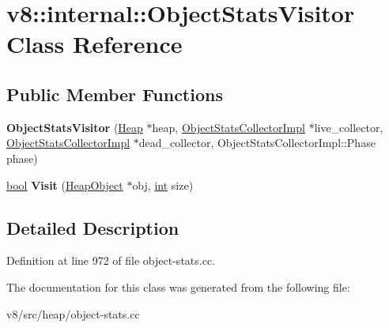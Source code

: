 \hypertarget{classv8_1_1internal_1_1ObjectStatsVisitor}{}\section{v8\+:\+:internal\+:\+:Object\+Stats\+Visitor Class Reference}
\label{classv8_1_1internal_1_1ObjectStatsVisitor}
\subsection*{Public Member Functions}
\begin{DoxyCompactItemize}
\item 
\mbox{\label{classv8_1_1internal_1_1ObjectStatsVisitor_a29e986cc7ed222c05d7e9b505ae61eb5}} 
{\bfseries Object\+Stats\+Visitor} (\mbox{\hyperlink{classv8_1_1internal_1_1Heap}{Heap}} $\ast$heap, \mbox{\hyperlink{classv8_1_1internal_1_1ObjectStatsCollectorImpl}{Object\+Stats\+Collector\+Impl}} $\ast$live\+\_\+collector, \mbox{\hyperlink{classv8_1_1internal_1_1ObjectStatsCollectorImpl}{Object\+Stats\+Collector\+Impl}} $\ast$dead\+\_\+collector, Object\+Stats\+Collector\+Impl\+::\+Phase phase)
\item 
\mbox{\label{classv8_1_1internal_1_1ObjectStatsVisitor_a7448a8b4702ebf8d7cf3b7e2ddd456c4}} 
\mbox{\hyperlink{classbool}{bool}} {\bfseries Visit} (\mbox{\hyperlink{classv8_1_1internal_1_1HeapObject}{Heap\+Object}} $\ast$obj, \mbox{\hyperlink{classint}{int}} size)
\end{DoxyCompactItemize}


\subsection{Detailed Description}


Definition at line 972 of file object-\/stats.\+cc.



The documentation for this class was generated from the following file\+:\begin{DoxyCompactItemize}
\item 
v8/src/heap/object-\/stats.\+cc\end{DoxyCompactItemize}
